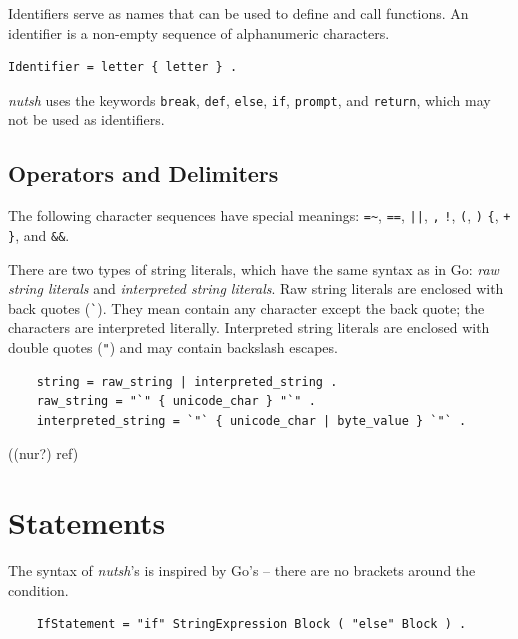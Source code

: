 \documentclass[a4paper,twoside,abstract=on,cleardoublepage=empty,numbers=noenddot,toc=bib]{scrreprt}
\begin{document}

Identifiers serve as names that can be used to define and call functions. An identifier is a non-empty sequence of alphanumeric characters.

\begin{lstlisting}
Identifier = letter { letter } .
\end{lstlisting}


\emph{nutsh} uses the keywords \texttt{break}, \texttt{def}, \texttt{else}, \texttt{if}, \texttt{prompt}, and \texttt{return}, which may not be used as identifiers.

\subsection{Operators and Delimiters}

The following character sequences have special meanings: \texttt{=\~},
\texttt{==},
\texttt{||},
\texttt{,}
\texttt{!},
\texttt{(},
\texttt{)}
\texttt{\{},
\texttt{+}
\texttt{\}}, and
\texttt{\&\&}.


There are two types of string literals, which have the same syntax as in Go: \emph{raw string literals} and \emph{interpreted string literals}. Raw string literals are enclosed with back quotes (\texttt{\`}). They mean contain any character except the back quote; the characters are interpreted literally. Interpreted string literals are enclosed with double quotes (\texttt{"}) and may contain backslash escapes.

\begin{lstlisting}
    string = raw_string | interpreted_string .
    raw_string = "`" { unicode_char } "`" .
    interpreted_string = `"` { unicode_char | byte_value } `"` .
\end{lstlisting}

((nur?) ref)

\section{Statements}


The syntax of \emph{nutsh}'s is inspired by Go's -- there are no brackets around the condition.

\begin{lstlisting}
    IfStatement = "if" StringExpression Block ( "else" Block ) .
\end{lstlisting}
\end{document}
